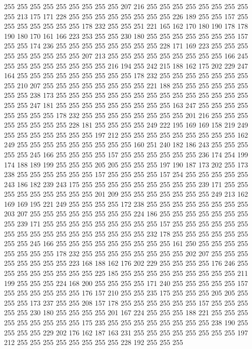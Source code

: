 255 255 255 255 255 255 255 255 255 207 216 255 255 255 255 255 255 255 255 255
213 175 171 228 255 255 255 255 255 255 255 255 226 189 255 255 157 255 255 255
255 255 255 255 178 232 255 255 251 221 165 162 170 180 190 178 178 190 180 170
161 166 223 253 255 255 230 180 255 255 255 255 255 255 255 157 255 255 174 236
255 255 255 255 255 255 255 255 228 171 169 223 255 255 255 255 255 255 255 255
255 207 213 255 255 255 255 255 255 255 255 255 166 245 255 255 255 255 255 255
255 255 216 194 255 242 215 188 162 175 202 229 247 164 255 255 255 255 255 255
255 255 255 178 232 255 255 255 255 255 255 255 255 210 207 255 255 255 255 255
255 255 255 221 188 255 255 255 255 255 255 255 255 238 173 255 255 255 255 255
255 255 255 255 255 255 255 255 255 255 255 255 247 181 255 255 255 255 255 255
255 255 255 163 247 255 255 255 255 255 255 255 255 178 232 255 255 255 255 255
255 255 255 201 216 255 255 255 255 255 255 255 255 228 181 255 255 255 255 249
222 195 169 169 158 219 249 255 255 255 255 255 255 255 197 212 255 255 255 255
255 255 255 255 255 162 249 255 255 255 255 255 255 255 255 255 160 251 240 182
186 243 255 255 255 255 255 245 166 255 255 255 255 157 255 255 255 255 255 255
236 174 254 199 174 188 189 199 255 255 255 205 205 255 255 255 197 190 187 173
202 255 173 238 255 255 255 255 255 255 157 255 255 255 255 157 254 255 255 255
255 255 243 186 182 239 243 175 255 255 255 255 255 255 255 255 255 239 171 255
255 255 255 255 255 255 255 255 201 209 255 255 255 255 255 255 255 249 213 162
169 169 195 221 249 255 255 255 255 172 238 255 255 255 255 255 255 255 255 203
207 255 255 255 255 255 255 255 255 224 186 255 255 255 255 255 255 255 255 239
171 255 255 255 255 255 255 255 255 255 157 255 255 255 255 255 255 255 255 255
255 255 255 255 255 255 255 255 232 178 255 255 255 255 255 255 255 255 245 166
255 255 255 255 255 255 255 255 255 161 250 255 255 255 255 255 255 255 255 178
232 255 255 255 255 255 255 255 255 202 207 255 255 255 255 255 255 255 255 223
168 188 162 176 202 229 255 255 255 255 176 246 255 255 255 255 255 255 255 255
225 185 255 255 255 255 255 255 255 255 255 211 199 255 255 255 224 168 200 255
255 255 255 171 240 255 255 255 255 255 157 255 255 255 255 255 255 176 157 210
255 255 235 175 255 255 255 205 205 255 255 255 173 237 255 255 208 157 178 255
255 255 255 255 255 157 255 255 255 255 255 230 180 255 255 255 255 201 167 224
255 255 255 188 221 255 255 255 255 255 255 255 255 255 175 235 255 255 255 255
255 255 255 255 238 190 255 255 255 255 229 202 176 162 187 163 231 255 255 255
255 255 255 255 255 197 212 255 255 255 255 255 255 255 255 228 192 255 255 255
